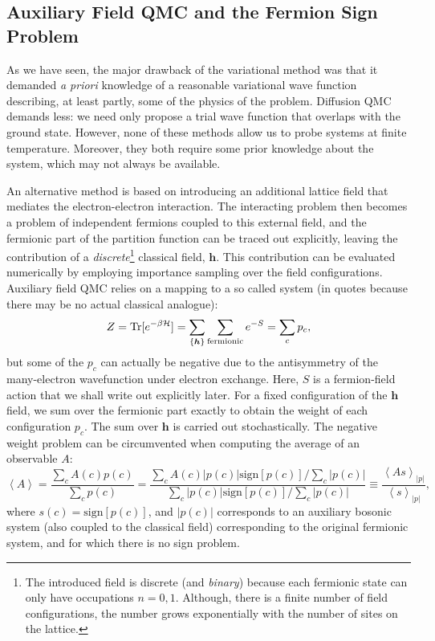 \subsection{Auxiliary Field \acs{QMC} and the Fermion Sign Problem}
\label{subsec:introAFQMC}

As we have seen, the major drawback of the variational method was that it demanded \emph{a priori} knowledge of a reasonable variational wave function describing, at least partly, some of the physics of the problem.
Diffusion \acs{QMC} demands less: we need only propose a trial wave function that overlaps with the ground state.
However, none of these methods allow us to probe systems at finite temperature.
Moreover, they both require some prior knowledge about the system, which may not always be available.

An alternative method is based on introducing an additional lattice field that mediates the electron-electron interaction.
The interacting problem then becomes a problem of independent fermions coupled to this external field, and the fermionic part of the partition function can be traced out explicitly, leaving the contribution of a \emph{discrete}\footnote{The introduced field is discrete (and \emph{binary}) because each fermionic state can only have occupations $n = 0, 1$. Although, there is a finite number of field configurations, the number grows exponentially with the number of sites on the lattice.} classical field, $\bm h$.
This contribution can be evaluated numerically by employing importance sampling over the field configurations.
Auxiliary field \acs{QMC} relies on a mapping to a so called  system (in quotes because there may be no actual classical analogue):
\begin{equation}\label{eq:Zsign}
Z = \operatorname{Tr} [ e^{-\beta \mathcal{H} } ] = \sum_{\{ \bm h\} } \sum_{\text{fermionic}} e^{-S} = \sum_c p_c ,
\end{equation}
but some of the  $p_c$ can actually be negative due to the antisymmetry of the many-electron wavefunction under electron exchange.
Here, $S$ is a fermion-field action that we shall write out explicitly later.
For a fixed configuration of the $\bm h$ field, we sum over the fermionic part exactly to obtain the weight of each configuration $p_c$.
The sum over $\bm h$ is carried out stochastically.
The negative weight problem can be circumvented when computing the average of an observable $A$:
\begin{equation}\label{eq:signSampling}
\left\langle A \right\rangle = \frac{\sum_c A ( c ) p ( c )}{\sum_c p ( c ) } = \frac{\sum_c A ( c )|  p ( c ) | \text{sign}[p(c)] / \sum_c | p ( c ) | }{\sum_c  |  p ( c ) | \text{sign}[p(c)] /  \sum_c | p ( c ) |} \equiv \frac{\left\langle A s \right\rangle_{|p|}}{\left\langle s \right\rangle_{|p|}} ,
\end{equation}
where $s(c) = \text{sign} [ p ( c ) ]$, and $| p ( c ) | $ corresponds to an auxiliary bosonic system (also coupled to the classical field) corresponding to the original fermionic system, and for which there is no sign problem.

